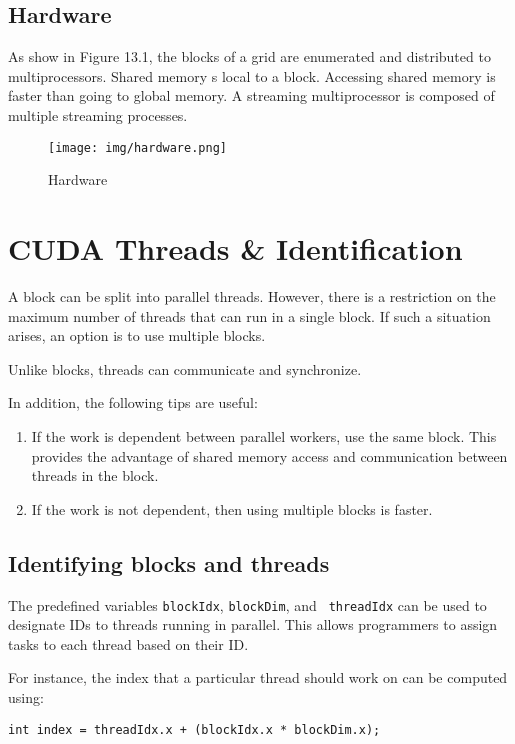 \documentclass[twoside]{article}
\begin{document}
\subsection{Hardware}

As show in Figure 13.1, the blocks of a grid are enumerated and distributed to 
multiprocessors. Shared memory s local to a block. Accessing shared memory
is faster than going to global memory. A streaming multiprocessor is composed of
multiple streaming processes.

\begin{figure}
  \texttt{[image: img/hardware.png]}
  \caption{Hardware}
\end{figure}

\section{CUDA Threads \& Identification}

A block can be split into parallel threads. However, there is a restriction
on the maximum number of threads that can run in a single block. If such a
situation arises, an option is to use multiple blocks.

Unlike blocks, threads can communicate and synchronize.

In addition, the following tips are useful:

\begin{enumerate}
    \item If the work is dependent between parallel workers, use the same
        block. This provides the advantage of shared memory access
        and communication between threads in the block.
    \item If the work is not dependent, then using multiple blocks is
        faster.
\end{enumerate}

\subsection{Identifying blocks and threads}

The predefined variables {\tt blockIdx}, {\tt blockDim}, and {\tt
threadIdx} can be used to designate IDs to threads running in parallel. This
allows programmers to assign tasks to each thread based on their ID.

For instance, the index that a particular thread should work on can be
computed using:

\begin{center}
    {{\tt int index = threadIdx.x + (blockIdx.x * blockDim.x); }}
\end{center}
\end{document}
